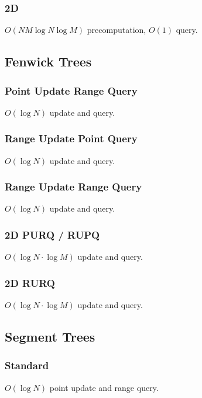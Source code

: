 \documentclass{article}
\begin{document}
\subsubsection{2D}
$O(NM \log N \log M)$ precomputation, $O(1)$ query.


\subsection{Fenwick Trees}
\subsubsection{Point Update Range Query}
$O(\log N)$ update and query.


\subsubsection{Range Update Point Query}
$O(\log N)$ update and query.


\subsubsection{Range Update Range Query}
$O(\log N)$ update and query.


\subsubsection{2D PURQ / RUPQ}
$O(\log N \cdot \log M)$ update and query.


\subsubsection{2D RURQ}
$O(\log N \cdot \log M)$ update and query.


\subsection{Segment Trees}
\subsubsection{Standard}
$O(\log N)$ point update and range query.

\end{document}
